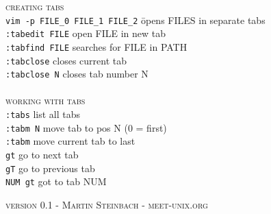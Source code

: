 \documentclass[a4paper,10pt]{scrartcl}
\begin{document}
\begin{tabbing}
\large{\textsc{creating tabs}}\\
\texttt{vim -p FILE\_0 FILE\_1 FILE\_2}	\hspace{0.5 cm}\= opens FILES in separate tabs\\
\texttt{:tabedit FILE}					\> open FILE in new tab\\
\texttt{:tabfind FILE}					\> searches for FILE in PATH\\
\texttt{:tabclose}						\> closes current tab\\
\texttt{:tabclose N}					\> closes tab number  N\\\\

\large{\textsc{working with tabs}}\\
\texttt{:tabs}			\> list all tabs\\
\texttt{:tabm N}		\> move tab to pos N (0 = first)\\
\texttt{:tabm}			\> move current tab to last\\
\texttt{gt}				\> go to next tab\\
\texttt{gT}				\> go to previous tab\\
\texttt{NUM gt}			\> got to tab NUM\\
\end{tabbing}

\vspace{1cm}
\centering\textsc{version 0.1 - Martin Steinbach - meet-unix.org}
\end{document}
